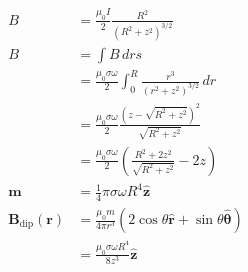 \documentclass{article}
\renewcommand{\vec}[1]{\boldsymbol{\mathbf{#1}}}
\newcommand{\uvec}[1]{\hat{\vec{#1}}}
\begin{document}
\subsection{}

\begin{align*}
  B                           & = \frac{\mu_0 I}{2} \frac{R^2}{(R^2 + z^2)^{3 / 2}}                                       \\
  B                           & = \int B \,d r s                                                                          \\
                              & = \frac{\mu_0 \sigma \omega}{2} \int_0^R \frac{r^3}{(r^2 + z^2)^{3 / 2}} \,d r            \\
                              & = \frac{\mu_0 \sigma \omega}{2} \frac{(z - \sqrt{R^2 + z^2})^2}{\sqrt{R^2 + z^2}}         \\
                              & = \frac{\mu_0 \sigma \omega}{2} \left( \frac{R^2 + 2 z^2}{\sqrt{R^2 + z^2}} - 2 z \right) \\
  \vec{m}                     & = \frac{1}{4} \pi \sigma \omega R^4 \uvec{z}                                              \\
  \vec{B}_\text{dip}(\vec{r}) & = \frac{\mu_0 m}{4 \pi r^3} (2 \cos \theta \uvec{r} + \sin \theta \uvec{\theta})          \\
                              & = \frac{\mu_0 \sigma \omega R^4}{8 z^3} \uvec{z}
\end{align*}

\subsection{}
\end{document}
